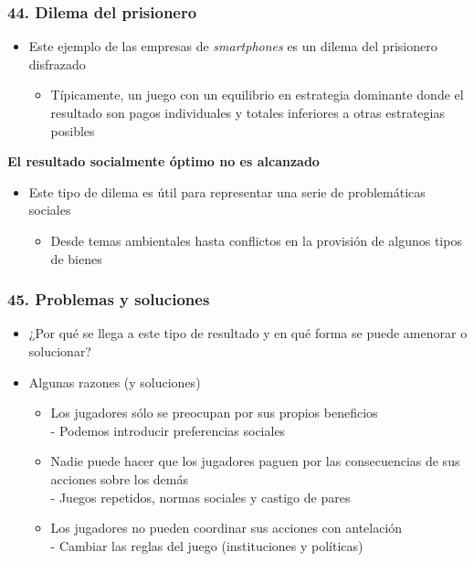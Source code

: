 \documentclass[14pt]{beamer}
\begin{document}
\begin{frame}
\frametitle{44. Dilema del prisionero}
\begin{itemize}
    \item Este ejemplo de las empresas de \textit{smartphones} es un dilema del prisionero disfrazado
        \begin{itemize}
        \item Típicamente, un juego con un equilibrio en estrategia dominante donde el resultado son pagos individuales y totales inferiores a otras estrategias posibles
        \end{itemize}
        \end{itemize}
        \textbf{El resultado socialmente óptimo no es alcanzado} \vspace{2mm}
        \begin{itemize}
        \item Este tipo de dilema es útil para representar una serie de problemáticas sociales
        \begin{itemize}
        \item Desde temas ambientales hasta conflictos en la provisión de algunos tipos de bienes
        \end{itemize}
\end{itemize}
\end{frame}

\begin{frame}
\frametitle{45. Problemas y soluciones}
\begin{itemize}
    \item ¿Por qué se llega a este tipo de resultado y en qué forma se puede amenorar o solucionar?
    \item Algunas razones (y soluciones)
        \begin{itemize}
        \item Los jugadores sólo se preocupan por sus propios beneficios \\
        - Podemos introducir preferencias sociales
        \item Nadie puede hacer que los jugadores paguen por las consecuencias de sus acciones sobre los demás \\
        - Juegos repetidos, normas sociales y castigo de pares
        \item Los jugadores no pueden coordinar sus acciones con antelación \\
        - Cambiar las reglas del juego (instituciones y políticas)
        \end{itemize}
\end{itemize}
\end{frame}
\end{document}

